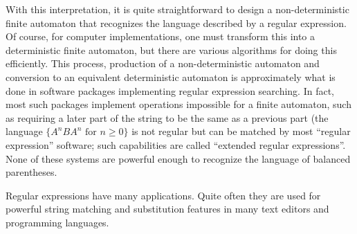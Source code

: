 \documentclass[12pt]{article}
\begin{document}

With this interpretation, it is quite straightforward to design a non-deterministic finite automaton that recognizes the language described by a regular expression.  Of course, for computer implementations, one must transform this into a deterministic finite automaton, but there are various algorithms for doing this efficiently.  This process, production of a non-deterministic automaton and conversion to an equivalent deterministic automaton is approximately what is done in software packages implementing regular expression searching.  In fact, most such packages implement operations impossible for a finite automaton, such as requiring a later part of the string to be the same as a previous part (the language $\{A^nBA^n\text{ for }n\geq 0\}$ is not regular but can be matched by most ``regular expression'' software; such capabilities are called ``extended regular expressions''.  None of these systems are powerful enough to recognize the language of balanced parentheses.

Regular expressions have many applications.  Quite often they are used for powerful string matching and substitution features in many text editors and programming languages.
\end{document}
